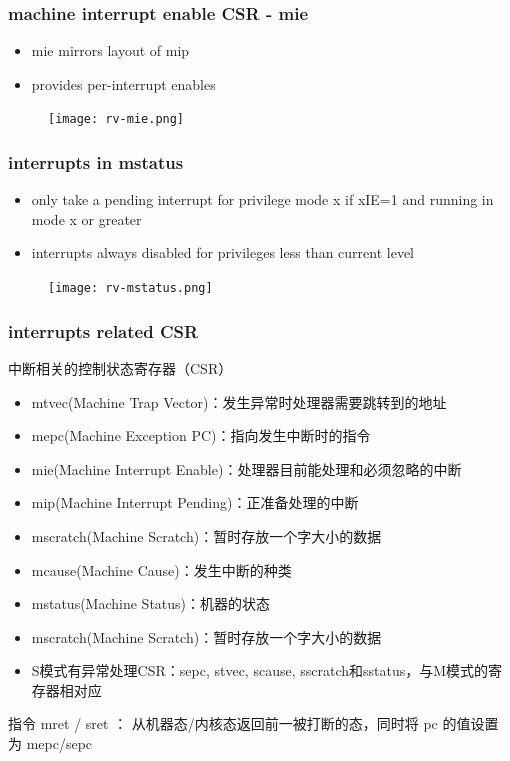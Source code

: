 \begin{frame}[fragile]
    \frametitle{machine interrupt enable CSR - mie}
    \begin{itemize}
        \item  mie mirrors layout of mip
        \item  provides per-interrupt enables	  
    \end{itemize}
    \begin{figure}
        \texttt{[image: rv-mie.png]}
    \end{figure}
\end{frame}
\begin{frame}[fragile]
    \frametitle{interrupts in mstatus}
    \begin{itemize}
        \item  only take a pending interrupt for privilege mode x if xIE=1 and running in mode x or greater
        \item  interrupts always disabled for privileges less than current level  
    \end{itemize}
    \begin{figure}
        \texttt{[image: rv-mstatus.png]}
    \end{figure}
\end{frame}

\begin{frame}[fragile]
    \frametitle{interrupts related CSR}
    中断相关的控制状态寄存器（CSR）
    \begin{itemize}
        \item mtvec(Machine Trap Vector)：发生异常时处理器需要跳转到的地址
        \item mepc(Machine Exception PC)：指向发生中断时的指令
        \item mie(Machine Interrupt Enable)：处理器目前能处理和必须忽略的中断
        \item mip(Machine Interrupt Pending)：正准备处理的中断
        \item mscratch(Machine Scratch)：暂时存放一个字大小的数据
        \item mcause(Machine Cause)：发生中断的种类
        \item mstatus(Machine Status)：机器的状态
        \item mscratch(Machine Scratch)：暂时存放一个字大小的数据
        \item S模式有异常处理CSR：sepc, stvec, scause, sscratch和sstatus，与M模式的寄存器相对应
    \end{itemize}
    指令 mret / sret ： 从机器态/内核态返回前一被打断的态，同时将 pc 的值设置为 mepc/sepc
\end{frame}


